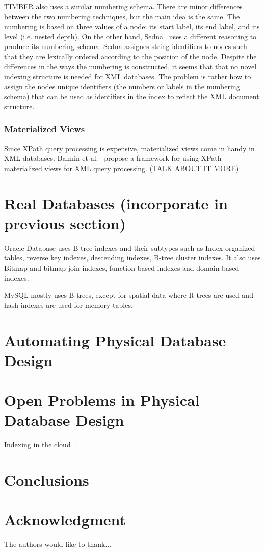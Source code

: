 \documentclass[12pt,a4paper]{article}
\begin{document}
TIMBER also uses a similar numbering schema. There are minor differences between the two numbering techniques, but the main idea is the same. The numbering is
based on three values of a node: its start label, its end label, and its level (i.e. nested depth). On the other hand, Sedna~\cite{taranov2010sedna} uses a
different reasoning to produce its numbering schema. Sedna assignes string identifiers to nodes such that they are lexically ordered according to the position
of the node. Despite the differences in the ways the numbering is constructed, it seems that that no novel indexing structure is needed for XML databases. The
problem is rather how to assign the nodes unique identifiers (the numbers or labels in the numbering schema) that can be used as identifiers in the index to
reflect the XML document structure.


\subsubsection{Materialized Views}

Since XPath query processing is expensive, materialized views come in handy in XML databases. Balmin et al.~\cite{balmin2004framework} propose a framework for
using XPath materialized views for XML query processing. (TALK ABOUT IT MORE)


\section{Real Databases (incorporate in previous section)}

Oracle Database uses B tree indexes and their subtypes such as Index-organized tables, reverse key indexes, descending indexes, B-tree cluster indexes. It also
uses Bitmap and bitmap join indexes, function based indexes and domain based indexes.


MySQL mostly uses B trees, except for spatial data where R trees are used and hash indexes are used for memory tables.

\section{Automating Physical Database Design}
\label{SEC-AUTO}

\section{Open Problems in Physical Database Design}
\label{SEC-OPEN}

Indexing in the cloud~\cite{wang2010indexing}.

\section{Conclusions}
\label{SEC-CONCL}

\section*{Acknowledgment}


The authors would like to thank...



%








\end{document}
